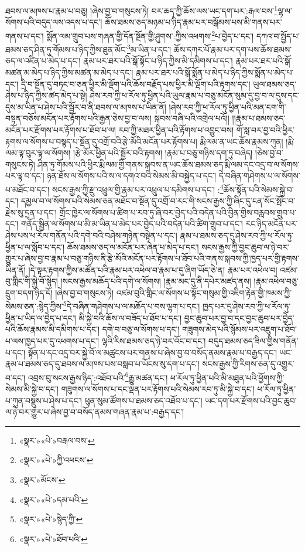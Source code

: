 ཐབས་ལ་མཁས་པ་རྣམ་པ་བཅུ། །ཞེས་བྱ་བ་གསུངས་ཏེ། བར་ཆད་ཀྱི་ཆོས་ལས་ཡང་དག་པར་:རྒལ་བས་\footnote{«སྣར་»«པེ་»བརྒལ་བས་}ལྷ་ལ་སོགས་པའི་བདུད་ལས་འདས་པ་དང་། ཆོས་ཐམས་ཅད་མཉམ་པ་ཉིད་རྣམ་པར་བསྒོམས་པས་མི་གནས་པར་གནས་པ་དང་། སྨོན་ལམ་གྲུབ་པས་གཞན་གྱི་དོན་སྔོན་གྱི་ཤུགས་:ཀྱིས་འཕགས་\footnote{«སྣར་»«པེ་»ཀྱི་འཕངས་}པ་བྱེད་པ་དང་། དཀའ་བ་སྤྱོད་པ་ཐམས་ཅད་ཤིན་ཏུ་གོམས་པ་ཉིད་ཀྱིས་ཐུན་མོང་\footnote{«སྣར་»མོངས་}མ་ཡིན་པ་དང་། ཆོས་དཀར་པོ་རྣམ་པར་དག་པས་ཆོས་ཐམས་ཅད་ལ་འཛིན་པ་མེད་པ་དང་། རྣམ་པར་ཐར་པའི་སྒོ་སྟོང་པ་ཉིད་ཀྱིས་མི་དམིགས་པ་དང་། རྣམ་པར་ཐར་པའི་སྒོ་མཚན་མ་མེད་པ་ཉིད་ཀྱིས་མཚན་མ་མེད་པ་དང་། རྣམ་པར་ཐར་པའི་སྒོ་སྨོན་པ་མེད་པ་ཉིད་ཀྱིས་སྨོན་པ་མེད་པ་དང་། དྲི་བ་སྔོན་དུ་བཏང་བ་ཅན་ཕྱིར་མི་ལྡོག་པའི་ཆོས་བརྗོད་པས་ཕྱིར་མི་ལྡོག་པའི་རྟགས་དང་། ཡུལ་ཐམས་ཅད་ཤེས་པ་ཉིད་ཀྱིས་ཚད་མེད་པ་སྟེ། ཤེས་རབ་ཀྱི་ཕ་རོལ་ཏུ་ཕྱིན་པའི་ཡུལ་རྣམ་པ་བཅུ་མངོན་སུམ་དུ་བྱ་བ་ལ་དུས་དང་དུས་མ་ཡིན་པ་ཤེས་པའི་སྦྱོར་བ་ནི་ཐབས་ལ་མཁས་པ་ཡིན་ནོ། །ཤེས་རབ་ཀྱི་ཕ་རོལ་ཏུ་ཕྱིན་པའི་མན་ངག་གི་བསྟན་བཅོས་མངོན་པར་རྟོགས་པའི་རྒྱན་ཅེས་བྱ་བ་ལས། སྐབས་བཞི་པའི་འགྲེལ་པའོ།། །།རྣམ་པ་ཐམས་ཅད་མངོན་པར་རྫོགས་པར་རྟོགས་པ་ཐོབ་པ་ལ། རབ་ཀྱི་མཐར་ཕྱིན་པའི་རྟོགས་པ་འབྱུང་བས། གོ་སླ་བར་བྱ་བའི་ཕྱིར་རྟགས་ལ་སོགས་པ་བསྙད་པ་སྔོན་དུ་འགྲོ་བའི་རྩེ་མོའི་མངོན་པར་རྟོགས་པ། རྨི་ལམ་ན་ཡང་ཆོས་རྣམས་ཀུན། །རྨི་ལམ་ལྟ་བུར་ལྟ་ལ་སོགས། །རྩེ་མོར་ཕྱིན་པའི་སྦྱོར་བའི་རྟགས། །རྣམ་པ་བཅུ་གཉིས་དག་ཏུ་བཞེད། །ཅེས་བྱ་བ་གསུངས་ཏེ། ཤིན་ཏུ་གོམས་པའི་ཕྱིར་རྨི་ལམ་གྱི་གནས་སྐབས་ན་ཡང་ཆོས་ཐམས་ཅད་རྨི་ལམ་དང་འདྲ་བ་ལ་སོགས་པར་ལྟ་བ་དང་། ཉན་ཐོས་ལ་སོགས་པའི་ས་ལ་དགའ་བའི་སེམས་མི་བསྐྱེད་པ་དང་། དེ་བཞིན་གཤེགས་པ་ལ་སོགས་པ་མཐོང་བ་དང་། སངས་རྒྱས་ཀྱི་རྫུ་འཕྲུལ་གྱི་རྣམ་པར་འཕྲུལ་པ་དམིགས་པ་དང་། :\footnote{«སྣར་»«པེ་»དམ་པའི་}ཆོས་སྟོན་པའི་སེམས་སྐྱེ་བ་དང་། དམྱལ་བ་ལ་སོགས་པའི་སེམས་ཅན་མཐོང་བ་སྔོན་དུ་འགྲོ་བ་རང་གི་སངས་རྒྱས་ཀྱི་ཞིང་དུ་ངན་སོང་སྤོང་བ་རྗེས་སུ་དྲན་པ་དང་། གྲོང་ཁྱེར་ལ་སོགས་པ་ཚིག་པ་རབ་ཏུ་ཞི་བར་བྱེད་པའི་བདེན་པའི་བྱིན་གྱིས་བརླབས་གྲུབ་པ་དང་། གནོད་སྦྱིན་ལ་སོགས་པ་མི་མ་ཡིན་པ་མེད་པར་བྱེད་པའི་བདེན་པའི་ཚིག་གྲུབ་པ་དང་། རང་ཉིད་མངོན་པར་ཤེས་པས་ཕ་རོལ་གནོན་པའི་དགེ་བའི་བཤེས་གཉེན་བསྟེན་པ་དང་། རྣམ་པ་ཐམས་ཅད་དུ་ཤེས་རབ་ཀྱི་ཕ་རོལ་ཏུ་ཕྱིན་པ་ལ་སློབ་པ་དང་། ཆོས་ཐམས་ཅད་ལ་མངོན་པར་ཞེན་པ་མེད་པ་དང་། སངས་རྒྱས་ཀྱི་བྱང་ཆུབ་ལ་ཉེ་བར་གྱུར་པ་ཞེས་བྱ་བ་རྣམ་པ་བཅུ་གཉིས་ནི་རྩེ་མོའི་མངོན་པར་རྟོགས་པ་ཐོབ་པའི་གནས་སྐབས་ཀྱི་ཁྱད་པར་གྱི་རྟགས་ཡིན་ནོ། །དེ་ལྟར་རྟགས་ཀྱིས་མཚོན་པའི་རྣམ་པར་འཕེལ་བ་རྣམ་པ་དུ་ཞིག་ཡོད་ཅེ་ན། རྣམ་པར་འཕེལ་བ། འཛམ་བུ་གླིང་གི་སྐྱེ་བོ་སྙེད། །སངས་རྒྱས་མཆོད་པའི་དགེ་ལ་སོགས། །རྣམ་མང་དུ་ནི་དཔེར་མཛད་ནས། །རྣམ་འཕེལ་བཅུ་དྲུག་བདག་ཉིད་དོ། །ཞེས་བྱ་བ་གསུངས་ཏེ། འཛམ་བུའི་གླིང་ལ་སོགས་པ་སྟོང་གསུམ་གྱི་འཇིག་རྟེན་གྱི་ཁམས་ཀྱི་སེམས་ཅན་:སྙེད་ཀྱིས་\footnote{«སྣར་»«པེ་»སྙེད་ཀྱི་}དེ་བཞིན་གཤེགས་པ་ལ་མཆོད་པ་བས་ལྷག་པ་དང་། ཁྱད་པར་དུ་ཤེས་རབ་ཀྱི་ཕ་རོལ་ཏུ་ཕྱིན་པ་ཡིད་ལ་བྱེད་པ་དང་། མི་སྐྱེ་བའི་ཆོས་ལ་བཟོད་པ་ཐོབ་པ་དང་། བྱང་ཆུབ་པར་བྱ་བ་དང་བྱང་ཆུབ་པར་བྱེད་པའི་ཆོས་རྣམས་མི་དམིགས་པ་དང་། དགེ་བ་བཅུ་ལ་སོགས་པ་དང་། གཟུགས་མེད་པའི་སྙོམས་པར་འཇུག་པ་ཐོབ་པ་ལས་ཁྱད་པར་དུ་འཕགས་པ་དང་། ལྷའི་རིས་ཐམས་ཅད་ཉེ་བར་འོང་བ་དང་། བདུད་ཐམས་ཅད་ཟིལ་གྱིས་གནོན་པ་དང་། སྟོན་པ་དང་འདྲ་བར་སྐྱེ་བོ་ལ་མཚུངས་པར་གནས་པ་ཞེས་བྱ་བ་བསོད་ནམས་རྣམ་པ་བརྒྱད་དང་། ཡང་རྣམ་པ་ཐམས་ཅད་དུ་ཐབས་ལ་མཁས་པས་བསླབ་པ་ཡོངས་སུ་དག་པ་དང་། སངས་རྒྱས་ཀྱི་རིགས་ཅན་དུ་འགྱུར་བ་དང་། འབྲས་བུ་སངས་རྒྱས་ཉིད་:འཐོབ་པའི་\footnote{«སྣར་»«པེ་»ཐོབ་པའི་}རྒྱུ་མཚན་དང་། ཕ་རོལ་ཏུ་ཕྱིན་པའི་མི་མཐུན་པའི་ཕྱོགས་ཀྱི་སེམས་མི་སྐྱེ་བ་དང་། གཟུགས་ལ་སོགས་པ་དང་ལྡན་པར་རྟོགས་པའི་སེམས་རབ་ཏུ་མི་སྐྱེ་བ་དང་། ཕ་རོལ་ཏུ་ཕྱིན་པ་ཀུན་བསྡུས་པ་ཤེས་པ་དང་། ཕུན་སུམ་ཚོགས་པ་ཐམས་ཅད་འཐོབ་པ་དང་། ཡང་དག་པར་རྫོགས་པའི་བྱང་ཆུབ་ལ་ཉེ་བར་གྱུར་པ་ཞེས་བྱ་བ་བསོད་ནམས་གཞན་རྣམ་པ་:བརྒྱད་དང་། 